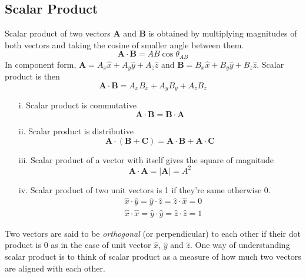 \documentclass[12pt,a4paper]{article}
\begin{document}
\subsection{Scalar Product}
Scalar product of two vectors \textbf{A} and \textbf{B} is obtained by multiplying magnitudes of both vectors and taking the cosine of smaller angle between them.
\begin{equation}
\textbf{A}\cdot \textbf{B}=AB\cos\theta_{AB}
\end{equation}
In component form, $\textbf{A}=A_x\hat x+A_y\hat y+A_z\hat z$ and $\textbf{B}=B_x\hat x+B_y\hat y+B_z\hat z$. Scalar product is then
\begin{equation}
\textbf{A}\cdot \textbf{B}=A_xB_x+A_yB_y+A_zB_z
\end{equation}
\begin{itemize}
\item[i.] Scalar product is commutative
\begin{equation*}
\textbf{A}\cdot \textbf{B}=\textbf{B}\cdot \textbf{A}
\end{equation*}
\item[ii.] Scalar product is distributive
\begin{equation*}
\textbf{A}\cdot (\textbf{B}+\textbf{C})=\textbf{A}\cdot \textbf{B}+\textbf{A}\cdot \textbf{C}
\end{equation*}
\item[iii.] Scalar product of a vector with itself gives the square of magnitude
\begin{equation*}
\textbf{A}\cdot \textbf{A}=|\textbf{A}|=A^2
\end{equation*}
\item[iv.] Scalar product of two unit vectors is 1 if they're same otherwise 0.
\begin{equation*}
\begin{split}
&\hat x\cdot\hat y=\hat y\cdot\hat z=\hat z\cdot\hat x=0\\
&\hat x\cdot\hat x=\hat y\cdot\hat y=\hat z\cdot\hat z=1
\end{split}
\end{equation*}
\end{itemize}
Two vectors are said to be \textit{orthogonal} (or perpendicular) to each other if their dot product is 0 as in the case of unit vector $\hat x$, $\hat y$ and $\hat z$. One way of understanding scalar product is to think of scalar product as a measure of how much two vectors are aligned with each other.
\end{document}
